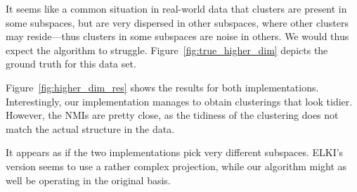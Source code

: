 \documentclass[english]{scrartcl}
\begin{document}
It seems like a common situation in real-world data that clusters are present
in some subspaces, but are very dispersed in other subspaces, where other
clusters may reside---thus clusters in some subspaces are noise in others. We
would thus expect the algorithm to struggle. Figure~\ref{fig:true_higher_dim} depicts
the ground truth for this data set.

Figure~\ref{fig:higher_dim_res} shows the results for both implementations.
Interestingly, our implementation manages to obtain clusterings that
look tidier. However, the NMIs are pretty close, as the tidiness of
the clustering does not match the actual structure in the data.

It appears as if the two implementations pick very different subspaces.
ELKI's version seems to use a rather complex projection, while our algorithm
might as well be operating in the original basis.
\end{document}
